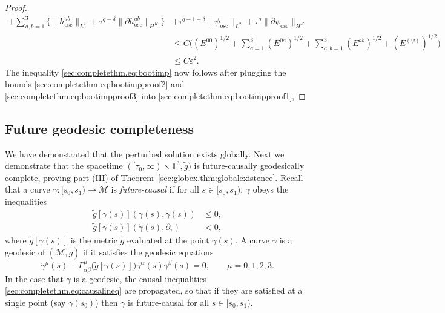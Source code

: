 \documentclass{article}
\newcommand{\TT}{\mathbb{T}}
\newcommand{\osc}{\mathrm{osc}}
\newcommand{\mc}{\mathcal}
\newcommand{\wt}{\widetilde}
\newcommand{\ve}{\varepsilon}
\newcommand{\pa}{\partial}
\newcommand{\ra}{\rightarrow}
\begin{document}
\begin{proof}
\begin{align}
        + \sum_{a,b=1}^3\Big\{\|h_{\osc}^{ab}\|_{L^2} + \tau^{q-\delta}\|\pa h_{\osc}^{ab}\|_{H^K}\Big\}& + \tau^{q-1+\delta}\|\psi_{\osc}\|_{L^2} + \tau^q\|\pa \psi_{\osc}\|_{H^K}\nonumber\\
        &\leq C\Big((E^{00})^{1/2} + \sum_{a=1}^3 (E^{0a})^{1/2} + \sum_{a,b=1}^3 (E^{ab})^{1/2} + (E^{(\psi)})^{1/2}\Big)\nonumber\\
        &\leq C\ve^2.\label{sec:completethm.eq:bootimpproof3}
    \end{align}
    The inequality \eqref{sec:completethm.eq:bootimp} now follows after plugging the bounds \eqref{sec:completethm.eq:bootimpproof2} and \eqref{sec:completethm.eq:bootimpproof3} into \eqref{sec:completethm.eq:bootimpproof1},
\end{proof}
\subsection{Future geodesic completeness}
We have demonstrated that the perturbed solution exists globally. Next we demonstrate that the spacetime $([\tau_0,\infty)\times\TT^3,\wt{g})$ is future-causally geodesically complete, proving part (III) of Theorem~\ref{sec:globex.thm:globalexistence}. Recall that a curve $\gamma:[s_0,s_1) \ra \mc{M}$ is \emph{future-causal} if for all $s \in [s_0,s_1)$, $\gamma$ obeys the inequalities
\begin{subequations}\label{sec:completethm.eq:causalineq} 
    \begin{align}
        \wt{g}[\gamma(s)](\dot{\gamma}(s),\dot{\gamma}(s)) &\leq 0,\label{sec:completethm.eq:causalineq1}\\
        \wt{g}[\gamma(s)](\dot{\gamma}(s),\pa_\tau) &< 0,\label{sec:completethm.eq:causalineq2}
    \end{align}
\end{subequations}
where $\wt{g}[\gamma(s)]$ is the metric $\wt{g}$ evaluated at the point $\gamma(s)$. A curve $\gamma$ is a geodesic of $(\mc{M},\wt{g})$ if it satisfies the geodesic equations
\begin{equation}\label{sec:completethm.eq:geodesic}
    \ddot{\gamma}^\mu(s) + \Gamma_{\alpha\beta}^\mu\big(\wt{g}[\gamma(s)]\big)\dot{\gamma}^{\alpha}(s)\dot{\gamma}^{\beta}(s) = 0,\qquad \mu=0,1,2,3.
\end{equation}
In the case that $\gamma$ is a geodesic, the causal inequalities \eqref{sec:completethm.eq:causalineq} are propagated, so that if they are satisfied at a single point (say $\gamma(s_0)$) then $\gamma$ is future-causal for all $s \in [s_0,s_1)$.
\end{document}
